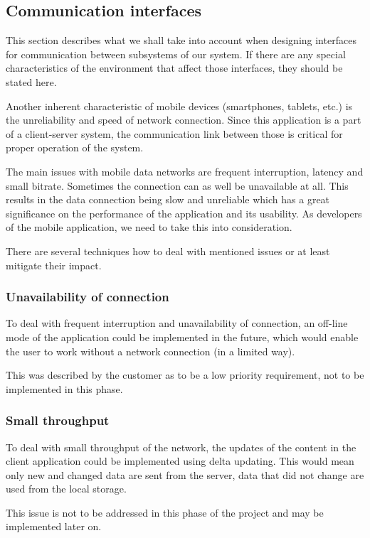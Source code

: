 \documentclass[11pt]{book}
\begin{document}
\subsection{Communication interfaces}
This section describes what we shall take into account when designing interfaces for communication between subsystems of our system. If there are any special characteristics of the environment that affect those interfaces, they should be stated here.

Another inherent characteristic of mobile devices (smartphones, tablets, etc.) is the unreliability and speed of network connection. Since this application is a part of a client-server system, the communication link between those is critical for proper operation of the system.

The main issues with mobile data networks are frequent interruption, latency and small bitrate. Sometimes the connection can as well be unavailable at all. This results in the data connection being slow and unreliable which has a great significance on the performance of the application and its usability. As developers of the mobile application, we need to take this into consideration.

There are several techniques how to deal with mentioned issues or at least mitigate their impact.

\subsubsection{Unavailability of connection}\label{sec:req_unavailability_of_connection}
To deal with frequent interruption and unavailability of connection, an off-line mode of the application could be implemented in the future, which would enable the user to work without a network connection (in a limited way).

This was described by the customer as to be a low priority requirement, not to be implemented in this phase.

\subsubsection{Small throughput}
To deal with small throughput of the network, the updates of the content in the client application could be implemented using delta updating. This would mean only new and changed data are sent from the server, data that did not change are used from the local storage.

This issue is not to be addressed in this phase of the project and may be implemented later on.
\end{document}
